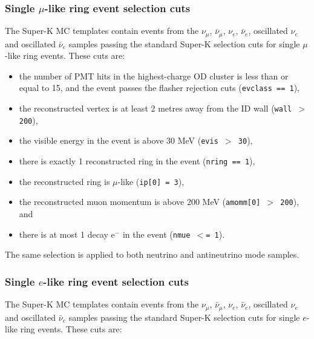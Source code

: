 \subsubsection {Single $\mu$-like ring event selection cuts}
\label{sec:mc_templates:1Rmu_cuts}

The Super-K MC templates contain events from the 
$\nu_{\mu}$, $\bar{\nu}_{\mu}$, $\nu_{e}$, $\bar{\nu}_{e}$, oscillated $\nu_{e}$ and oscillated $\bar{\nu}_{e}$ 
 samples passing the standard Super-K selection cuts for single $\mu$-like ring events.
These cuts are:

\begin{itemize}
\item
the number of PMT hits in the highest-charge OD cluster is less than or
equal to 15, and the event passes the flasher rejection cuts
({\tt evclass == 1}),
\item
the reconstructed vertex is at least 2 metres away from the ID wall 
({\tt wall $>$ 200}),
\item
the visible energy in the event is above 30 MeV 
({\tt evis  $>$ 30}),
\item
there is exactly 1 reconstructed ring in the event 
({\tt nring == 1}),
\item
the reconstructed ring is $\mu$-like 
({\tt ip[0] = 3}),
\item
the reconstructed muon momentum is above 200 MeV 
({\tt amomm[0] $>$ 200}), and
\item
there is at most 1 decay e$^{-}$ in the event 
({\tt nmue $<$= 1}).
\end{itemize}

The same selection is applied to both neutrino and antineutrino mode samples.



\subsubsection {Single $e$-like ring event selection cuts}
\label{sec:mc_templates:1Re_cuts}

The Super-K MC templates contain events from the 
$\nu_{\mu}$, $\bar{\nu}_{\mu}$, $\nu_{e}$, $\bar{\nu}_{e}$, oscillated $\nu_{e}$ and oscillated $\bar{\nu}_{e}$ 
 samples passing the standard Super-K selection cuts for single $e$-like ring events.
These cuts are:

